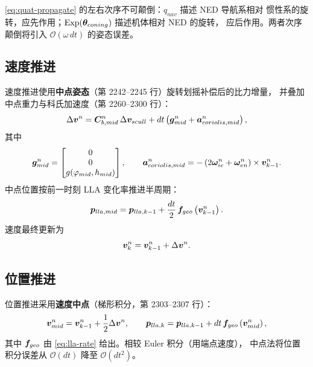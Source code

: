 \begin{remark}
\cref{eq:quat-propagate} 的左右次序不可颠倒：$q_{nav}$ 描述 NED 导航系相对
惯性系的旋转，应先作用；$\operatorname{Exp}(\boldsymbol{\theta}_{coning})$ 描述机体相对 NED 的旋转，
应后作用。两者次序颠倒将引入 $\mathcal{O}(\omega\,dt)$ 的姿态误差。
\end{remark}

\subsection{速度推进}

速度推进使用\textbf{中点姿态}（第 2242--2245 行）旋转划摇补偿后的比力增量，
并叠加中点重力与科氏加速度（第 2260--2300 行）：
\begin{equation}
  \Delta\boldsymbol{v}^n = \boldsymbol{C}_{b,mid}^n\,\Delta\boldsymbol{v}_{scull}
    + dt\left(\boldsymbol{g}_{mid}^n + \boldsymbol{a}_{coriolis,mid}^n\right),
  \label{eq:vel-propagate}
\end{equation}
其中
\begin{equation}
  \boldsymbol{g}_{mid}^n = \begin{bmatrix} 0 \\ 0 \\ g(\varphi_{mid}, h_{mid}) \end{bmatrix},
  \qquad
  \boldsymbol{a}_{coriolis,mid}^n = -\left(2\boldsymbol{\omega}_{ie}^n
    + \boldsymbol{\omega}_{en}^n\right)\times\boldsymbol{v}_{k-1}^n.
  \label{eq:mid-terms}
\end{equation}
中点位置按前一时刻 LLA 变化率推进半周期：
\begin{equation}
  \boldsymbol{p}_{lla,mid} = \boldsymbol{p}_{lla,k-1}
    + \frac{dt}{2}\,\boldsymbol{f}_{geo}\left(\boldsymbol{v}_{k-1}^n\right).
  \label{eq:lla-mid}
\end{equation}
速度最终更新为
\begin{equation}
  \boldsymbol{v}_k^n = \boldsymbol{v}_{k-1}^n + \Delta\boldsymbol{v}^n.
  \label{eq:vel-update}
\end{equation}

\subsection{位置推进}

位置推进采用\textbf{速度中点}（梯形积分，第 2303--2307 行）：
\begin{equation}
  \boldsymbol{v}_{mid}^n = \boldsymbol{v}_{k-1}^n + \frac{1}{2}\Delta\boldsymbol{v}^n,
  \qquad
  \boldsymbol{p}_{lla,k} = \boldsymbol{p}_{lla,k-1}
    + dt\,\boldsymbol{f}_{geo}\left(\boldsymbol{v}_{mid}^n\right),
  \label{eq:pos-propagate}
\end{equation}
其中 $\boldsymbol{f}_{geo}$ 由 \cref{eq:lla-rate} 给出。相较 Euler 积分（用端点速度），
中点法将位置积分误差从 $\mathcal{O}(dt)$ 降至 $\mathcal{O}(dt^2)$。

